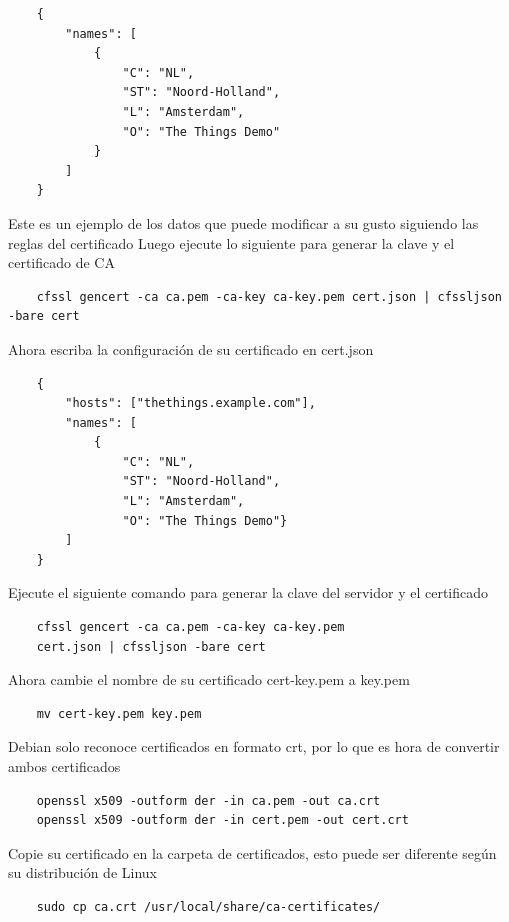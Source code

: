 \begin{lstlisting}
    {
        "names": [
            {
                "C": "NL", 
                "ST": "Noord-Holland", 
                "L": "Amsterdam", 
                "O": "The Things Demo"
            }
        ]
    }
\end{lstlisting}

Este es un ejemplo de los datos que puede modificar a su gusto siguiendo las reglas del certificado
Luego ejecute lo siguiente para generar la clave y el certificado de CA

\begin{lstlisting}
    cfssl gencert -ca ca.pem -ca-key ca-key.pem cert.json | cfssljson -bare cert
\end{lstlisting}

Ahora escriba la configuración de su certificado en cert.json

\begin{lstlisting}
    {
        "hosts": ["thethings.example.com"],
        "names": [
            {
                "C": "NL", 
                "ST": "Noord-Holland", 
                "L": "Amsterdam", 
                "O": "The Things Demo"}
        ]
    }
\end{lstlisting}

Ejecute el siguiente comando para generar la clave del servidor y el certificado

\begin{lstlisting}
    cfssl gencert -ca ca.pem -ca-key ca-key.pem 
    cert.json | cfssljson -bare cert
\end{lstlisting}

Ahora cambie el nombre de su certificado cert-key.pem a key.pem

\begin{lstlisting}
    mv cert-key.pem key.pem
\end{lstlisting}

Debian solo reconoce certificados en formato crt, por lo que es hora de convertir ambos certificados

\begin{lstlisting}
    openssl x509 -outform der -in ca.pem -out ca.crt
    openssl x509 -outform der -in cert.pem -out cert.crt
\end{lstlisting}

Copie su certificado en la carpeta de certificados, esto puede ser diferente según su distribución
de Linux

\begin{lstlisting}
    sudo cp ca.crt /usr/local/share/ca-certificates/
\end{lstlisting}

